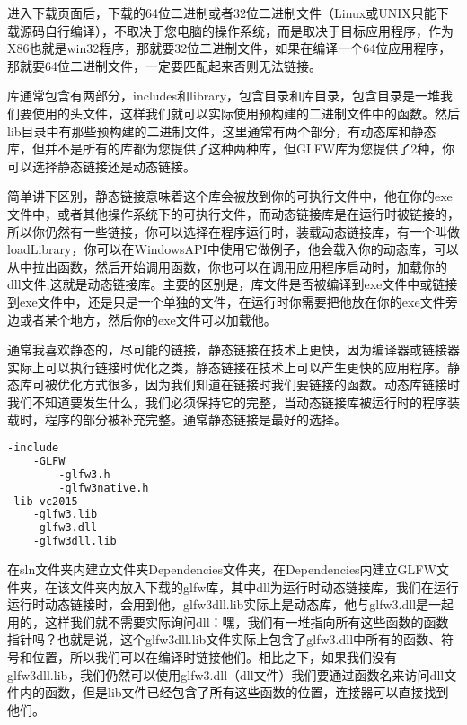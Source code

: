进入下载页面后，下载的64位二进制或者32位二进制文件（Linux或UNIX只能下载源码自行编译），不取决于您电脑的操作系统，而是取决于目标应用程序，作为{\ncodestyle X86}也就是{\ncodestyle win32}程序，那就要32位二进制文件，如果在编译一个64位应用程序，那就要64位二进制文件，一定要匹配起来否则无法链接。

库通常包含有两部分，{\ncodestyle includes}和{\ncodestyle library}，包含目录和库目录，包含目录是一堆我们要使用的头文件，这样我们就可以实际使用预构建的二进制文件中的函数。然后{\ncodestyle lib}目录中有那些预构建的二进制文件，这里通常有两个部分，有动态库和静态库，但并不是所有的库都为您提供了这种两种库，但{\ncodestyle GLFW}库为您提供了2种，你可以选择静态链接还是动态链接。

简单讲下区别，静态链接意味着这个库会被放到你的可执行文件中，他在你的exe文件中，或者其他操作系统下的可执行文件，而动态链接库是在运行时被链接的，所以你仍然有一些链接，你可以选择在程序运行时，装载动态链接库，有一个叫做{\ncodestyle loadLibrary}，你可以在{\ncodestyle WindowsAPI}中使用它做例子，他会载入你的动态库，可以从中拉出函数，然后开始调用函数，你也可以在调用应用程序启动时，加载你的{\ncodestyle dll}文件,这就是动态链接库。主要的区别是，库文件是否被编译到exe文件中或链接到exe文件中，还是只是一个单独的文件，在运行时你需要把他放在你的exe文件旁边或者某个地方，然后你的exe文件可以加载他。

通常我喜欢静态的，尽可能的链接，静态链接在技术上更快，因为编译器或链接器实际上可以执行链接时优化之类，静态链接在技术上可以产生更快的应用程序。静态库可被优化方式很多，因为我们知道在链接时我们要链接的函数。动态库链接时我们不知道要发生什么，我们必须保持它的完整，当动态链接库被运行时的程序装载时，程序的部分被补充完整。通常静态链接是最好的选择。

\begin{lstlisting}[language=bash]
-include
    -GLFW
        -glfw3.h
        -glfw3native.h
-lib-vc2015
    -glfw3.lib
    -glfw3.dll
    -glfw3dll.lib
\end{lstlisting}


在sln文件夹内建立文件夹Dependencies文件夹，在Dependencies内建立GLFW文件夹，在该文件夹内放入下载的glfw库，其中dll为运行时动态链接库，我们在运行运行时动态链接时，会用到他，glfw3dll.lib实际上是动态库，他与glfw3.dll是一起用的，这样我们就不需要实际询问dll：嘿，我们有一堆指向所有这些函数的函数指针吗？也就是说，这个glfw3dll.lib文件实际上包含了glfw3.dll中所有的函数、符号和位置，所以我们可以在编译时链接他们。相比之下，如果我们没有glfw3dll.lib，我们仍然可以使用glfw3.dll（dll文件）我们要通过函数名来访问dll文件内的函数，但是lib文件已经包含了所有这些函数的位置，连接器可以直接找到他们。

